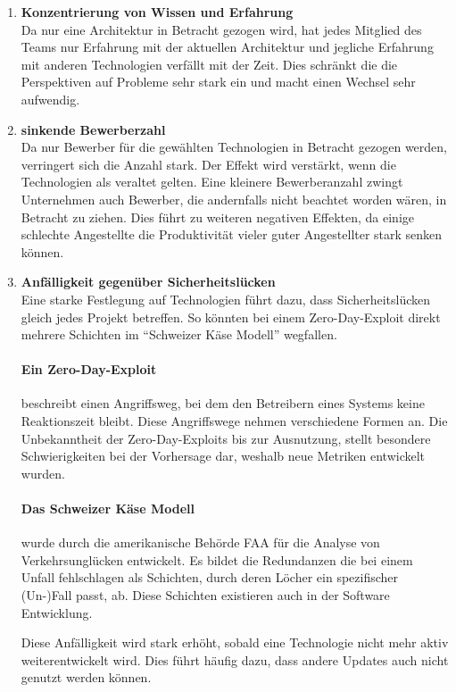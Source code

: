 \documentclass[./einleitung.tex]{subfiles}
\begin{document}
\begin{enumerate}
\item \textbf{Konzentrierung von Wissen und Erfahrung} \\
Da nur eine Architektur in Betracht gezogen wird, hat jedes Mitglied des Teams nur Erfahrung mit der aktuellen Architektur und jegliche Erfahrung mit anderen Technologien verfällt mit der Zeit. Dies schränkt die die Perspektiven auf Probleme sehr stark ein und macht einen Wechsel sehr aufwendig.
\item \textbf{sinkende Bewerberzahl} \\
Da nur Bewerber für die gewählten Technologien in Betracht gezogen werden, verringert sich die Anzahl stark.
Der Effekt wird verstärkt, wenn die Technologien als veraltet gelten.
Eine kleinere Bewerberanzahl zwingt Unternehmen auch Bewerber, die andernfalls nicht beachtet worden wären, in Betracht zu ziehen.
Dies führt zu weiteren negativen Effekten, da einige schlechte Angestellte die Produktivität vieler guter Angestellter stark senken können.
\item \textbf{Anfälligkeit gegenüber Sicherheitslücken} \\
Eine starke Festlegung auf Technologien führt dazu, dass Sicherheitslücken gleich jedes Projekt betreffen.
So könnten bei einem Zero-Day-Exploit direkt mehrere Schichten im ``Schweizer Käse Modell'' wegfallen.
\begin{center}
    \paragraph{Ein Zero-Day-Exploit} beschreibt einen Angriffsweg, bei dem den Betreibern eines Systems keine Reaktionszeit bleibt. \cite{ibmZeroDay}
    Diese Angriffswege nehmen verschiedene Formen an.
    Die Unbekanntheit der Zero-Day-Exploits bis zur Ausnutzung, stellt besondere Schwierigkeiten bei der Vorhersage dar, weshalb neue Metriken entwickelt wurden. \cite{wang2013k}
\end{center}
\begin{center}
    \paragraph{Das Schweizer Käse Modell} wurde durch die amerikanische Behörde FAA für die Analyse von Verkehrsunglücken entwickelt.
    Es bildet die Redundanzen die bei einem Unfall fehlschlagen als Schichten, durch deren Löcher ein spezifischer (Un-)Fall passt, ab.
    Diese Schichten existieren auch in der Software Entwicklung.\cite{bergeon2009swiss} %
\end{center}
Diese Anfälligkeit wird stark erhöht, sobald eine Technologie nicht mehr aktiv weiterentwickelt wird.
Dies führt häufig dazu, dass andere Updates auch nicht genutzt werden können.
\end{enumerate}
\end{document}
